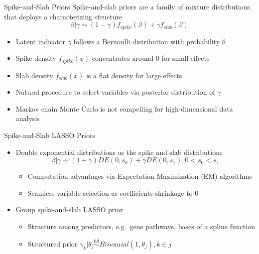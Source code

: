 \documentclass[
  ignorenonframetext,
  aspectratio=169]{beamer}
\providecommand{\tightlist}{%
  \setlength{\itemsep}{0pt}\setlength{\parskip}{0pt}}
\newcommand{\simiid}{\overset{\text{iid}}{\sim}}
\begin{document}
\begin{frame}{Spike-and-Slab Priors}
\protect\hypertarget{spike-and-slab-priors}{}
Spike-and-slab priors are a family of mixture distributions that deploys
a characterizing structure
\[\beta|\gamma \sim (1-\gamma)f_{spike}(\beta) + \gamma f_{slab}(\beta)\]

\begin{itemize}
\item
  Latent indicator \(\gamma\) follows a Bernoulli distribution with
  probability \(\theta\)
\item
  Spike density \(f_{spike}(x)\) concentrates around 0 for small effects
\item
  Slab density \(f_{slab}(x)\) is a flat density for large effects
\item
  Natural procedure to select variables via posterior distribution of
  \(\gamma\)
\item
  Markov chain Monte Carlo is not compelling for high-dimensional data
  analysis
\end{itemize}
\end{frame}

\begin{frame}{Spike-and-Slab LASSO Priors}
\protect\hypertarget{spike-and-slab-lasso-priors}{}
\begin{itemize}
\tightlist
\item
  Double exponential distributions as the spike and slab distributions
  \[\beta|\gamma \sim (1-\gamma)DE(0, s_0) + \gamma DE(0, s_1), 0 < s_0 < s_1\]

  \begin{itemize}
  \tightlist
  \item
    Computation advantages via Expectation-Maximization (EM) algorithms
  \item
    Seamless variable selection as coefficients shrinkage to 0
  \end{itemize}
\item
  Group spike-and-slab LASSO prior

  \begin{itemize}
  \tightlist
  \item
    Structure among predictors, e.g.~gene pathways, bases of a spline
    function
  \item
    Structured prior
    \(\gamma_k | \theta_j \simiid Binomial(1, \theta_j), k \in j\)
  \end{itemize}
\end{itemize}
\end{frame}
\end{document}

